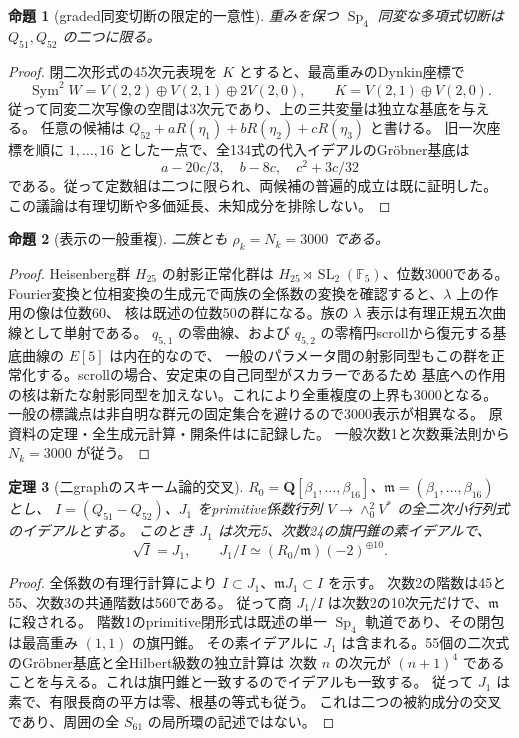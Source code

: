 \documentclass[11pt,a4paper]{ltjsarticle}
\newcommand{\QQ}{\mathbf Q}
\DeclareMathOperator{\Sp}{Sp}
\newtheorem{theorem}{定理}[section]
\newtheorem{proposition}[theorem]{命題}
\theoremstyle{remark}
\begin{document}
\begin{proposition}[graded同変切断の限定的一意性]
重みを保つ $\Sp_4$ 同変な多項式切断は $Q_{51},Q_{52}$ の二つに限る。
\end{proposition}
\begin{proof}
閉二次形式の45次元表現を $K$ とすると、最高重みのDynkin座標で
\[
 \operatorname{Sym}^2W=V(2,2)\oplus V(2,1)\oplus2V(2,0),\qquad
 K=V(2,1)\oplus V(2,0).
\]
従って同変二次写像の空間は3次元であり、上の三共変量は独立な基底を与える。
任意の候補は $Q_{52}+aR(\eta_1)+bR(\eta_2)+cR(\eta_3)$ と書ける。
旧一次座標を順に $1,\ldots,16$ とした一点で、全134式の代入イデアルのGr\"obner基底は
\[
 a-20c/3,\quad b-8c,\quad c^2+3c/32
\]
である。従って定数組は二つに限られ、両候補の普遍的成立は既に証明した。
この議論は有理切断や多価延長、未知成分を排除しない。
\end{proof}

\begin{proposition}[表示の一般重複]
二族とも $\rho_k=N_k=3000$ である。
\end{proposition}
\begin{proof}
Heisenberg群 $H_{25}$ の射影正常化群は $H_{25}\rtimes\operatorname{SL}_2(\mathbb F_5)$、位数3000である。
Fourier変換と位相変換の生成元で両族の全係数の変換を確認すると、$\lambda$ 上の作用の像は位数60、
核は既述の位数50の群になる。族の $\lambda$ 表示は有理正規五次曲線として単射である。
$q_{5,1}$ の零曲線、および $q_{5,2}$ の零楕円scrollから復元する基底曲線の $E[5]$ は内在的なので、
一般のパラメータ間の射影同型もこの群を正常化する。scrollの場合、安定束の自己同型がスカラーであるため
基底への作用の核は新たな射影同型を加えない。これにより全重複度の上界も3000となる。
一般の標識点は非自明な群元の固定集合を避けるので3000表示が相異なる。
原資料の定理・全生成元計算・開条件は\cite{elliptic-redundancy-new}に記録した。
一般次数1と次数乗法則から $N_k=3000$ が従う。
\end{proof}

\begin{theorem}[二graphのスキーム論的交叉]
$R_0=\QQ[\beta_1,\ldots,\beta_{16}]$、$\mathfrak m=(\beta_1,\ldots,\beta_{16})$ とし、
$I=(Q_{51}-Q_{52})$、$J_1$ をprimitive係数行列 $V\to\wedge^2_0V^*$ の全二次小行列式のイデアルとする。
このとき $J_1$ は次元5、次数24の旗円錐の素イデアルで、
\[
 \sqrt I=J_1,\qquad J_1/I\simeq(R_0/\mathfrak m)(-2)^{\oplus10}.
\]
\end{theorem}
\begin{proof}
全係数の有理行計算により $I\subset J_1$、$\mathfrak mJ_1\subset I$ を示す。
次数2の階数は45と55、次数3の共通階数は560である。
従って商 $J_1/I$ は次数2の10次元だけで、$\mathfrak m$ に殺される。
階数1のprimitive閉形式は既述の単一 $\Sp_4$ 軌道であり、その閉包は最高重み $(1,1)$ の旗円錐。
その素イデアルに $J_1$ は含まれる。55個の二次式のGr\"obner基底と全Hilbert級数の独立計算は
次数 $n$ の次元が $(n+1)^4$ であることを与える。これは旗円錐と一致するのでイデアルも一致する。
従って $J_1$ は素で、有限長商の平方は零、根基の等式も従う\cite{elliptic-intersection-new}。
これは二つの被約成分の交叉であり、周囲の全 $S_{61}$ の局所環の記述ではない。
\end{proof}
\end{document}

